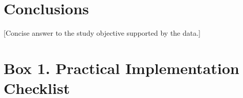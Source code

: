 \documentclass[12pt]{article}
\begin{document}
\section{Conclusions}

 [Concise answer to the study objective supported by the data.]

%
%
%
%
%
%
%
%


\section*{Box 1. Practical Implementation Checklist}
\end{document}
